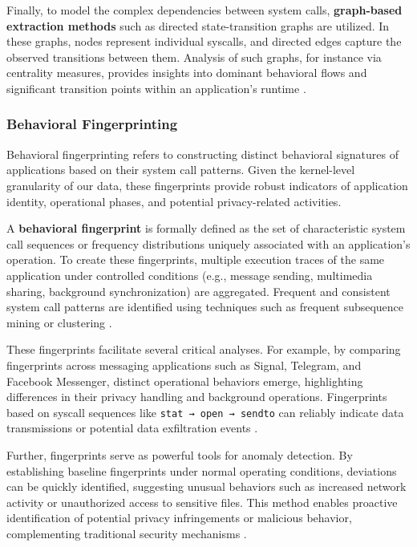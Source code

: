 \documentclass[a4paper,12pt]{report}
\begin{document}
Finally, to model the complex dependencies between system calls, \textbf{graph-based extraction methods} such as directed state-transition graphs are utilized. In these graphs, nodes represent individual syscalls, and directed edges capture the observed transitions between them. Analysis of such graphs, for instance via centrality measures, provides insights into dominant behavioral flows and significant transition points within an application's runtime \cite{newman2010networks}.

\subsubsection{Behavioral Fingerprinting}
Behavioral fingerprinting refers to constructing distinct behavioral signatures of applications based on their system call patterns. Given the kernel-level granularity of our data, these fingerprints provide robust indicators of application identity, operational phases, and potential privacy-related activities.

A \textbf{behavioral fingerprint} is formally defined as the set of characteristic system call sequences or frequency distributions uniquely associated with an application's operation. To create these fingerprints, multiple execution traces of the same application under controlled conditions (e.g., message sending, multimedia sharing, background synchronization) are aggregated. Frequent and consistent system call patterns are identified using techniques such as frequent subsequence mining or clustering \cite{han2022datamining}.

These fingerprints facilitate several critical analyses. For example, by comparing fingerprints across messaging applications such as Signal, Telegram, and Facebook Messenger, distinct operational behaviors emerge, highlighting differences in their privacy handling and background operations. Fingerprints based on syscall sequences like \texttt{stat → open → sendto} can reliably indicate data transmissions or potential data exfiltration events \cite{enck2014taintdroid}.

Further, fingerprints serve as powerful tools for anomaly detection. By establishing baseline fingerprints under normal operating conditions, deviations can be quickly identified, suggesting unusual behaviors such as increased network activity or unauthorized access to sensitive files. This method enables proactive identification of potential privacy infringements or malicious behavior, complementing traditional security mechanisms \cite{chandola2009anomaly}.
\end{document}
